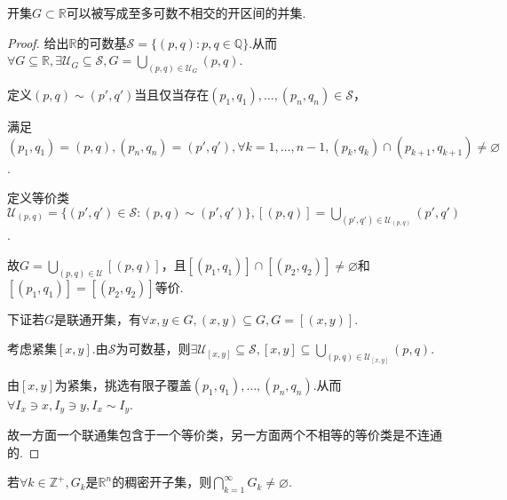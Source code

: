 \begin{comment}
\begin{problem}[28]\label{1.B.28}
    证明可分度量空间\(X\)的闭子集\(F\)都是一个完全集\(P\)和一个至多可数集的并.
\end{problem}

\begin{proof}
    令\(P\)是\(F\)所有凝点的集合，由于\(F\)是闭集，故\(P \subseteq F\).

    延续\cref{1.B.27}的操作，即可证明\(P\)是完全集且\(F \setminus P\)是至多可数集.
\end{proof}
\end{comment}

\begin{problem}[29]\label{1.B.29}
    开集\(G \subset \mathbb{R}\)可以被写成至多可数不相交的开区间的并集.
\end{problem}

\begin{proof}
    给出\(\mathbb{R}\)的可数基\(\mathcal{S}=\{(p,q): p,q \in \mathbb{Q}\}\).从而\(\forall G \subseteq \mathbb{R}, \exists \mathcal{U}_G \subseteq \mathcal{S}, G=\bigcup_{(p,q) \in \mathcal{U}_G}(p,q)\).

    定义\((p,q) \sim (p',q')\)当且仅当存在\((p_1,q_1), \dots, (p_n,q_n) \in \mathcal{S}\)，
    
    满足\((p_1,q_1)=(p,q), (p_n,q_n)=(p',q'), \forall k=1, \dots, n-1, (p_k,q_k) \cap (p_{k+1}, q_{k+1}) \ne \varnothing\).

    定义等价类\(\mathcal{U}_{(p,q)}=\{(p',q') \in \mathcal{S}: (p,q) \sim (p',q')\}, [(p,q)]=\bigcup_{(p',q') \in \mathcal{U}_{(p,q)}}(p',q')\).

    故\(G=\bigcup_{(p,q) \in \mathcal{U}} [(p,q)]\)，且\([(p_1,q_1)] \cap [(p_2,q_2)] \ne \varnothing\)和\([(p_1,q_1)]=[(p_2,q_2)]\)等价.

    下证若\(G\)是{\kaishu 联通开集}，有\(\forall x,y \in G, (x,y) \subseteq G, G=[(x,y)]\).
    
    考虑紧集\([x,y]\).由\(\mathcal{S}\)为可数基，则\(\exists \mathcal{U}_{[x,y]} \subseteq \mathcal{S}, [x,y] \subseteq \bigcup_{(p,q) \in \mathcal{U}_{[x,y]}} (p,q)\).

    由\([x,y]\)为紧集，挑选有限子覆盖\((p_1,q_1), \dots, (p_n,q_n)\).从而\(\forall I_x \ni x, I_y \ni y, I_x \sim I_y\).

    {\kaishu 故一方面一个联通集包含于一个等价类，另一方面两个不相等的等价类是不连通的.}
\end{proof}

\begin{problem}[30]\label{1.B.30}
    若\(\forall k \in \mathbb{Z}^+, G_k\)是\(\mathbb{R}^n\)的稠密开子集，则\(\bigcap_{k=1}^\infty G_k \ne \varnothing\).
\end{problem}

